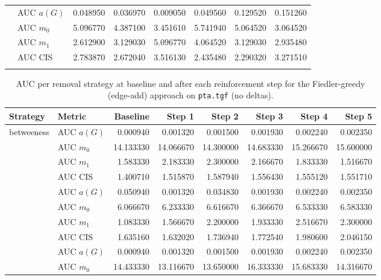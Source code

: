 \begin{table}[htbp]
\begin{tabular}{llrrrrrr}
    \addlinespace
    \multirow{4}{*}{random} & AUC $a(G)$ & 0.048950 & 0.036970 & 0.009050 & 0.049560 & 0.129520 & 0.151260 \\
    & AUC $m_0$ & 5.096770 & 4.387100 & 3.451610 & 5.741940 & 5.064520 & 3.064520 \\
    & AUC $m_1$ & 2.612900 & 3.129030 & 5.096770 & 4.064520 & 3.129030 & 2.935480 \\
    & AUC CIS & 2.783870 & 2.672040 & 3.516130 & 2.435480 & 2.290320 & 3.271510 \\
    \addlinespace
    \bottomrule
  \end{tabular}
\end{table}

\begin{table}[htbp]
  \centering
  \caption{AUC per removal strategy at baseline and after each reinforcement step for the Fiedler-greedy (edge-add) approach on \texttt{pta.tgf} (no deltas).}
  \label{tab:pta-fiedler_greedy-auc}
  \begin{tabular}{llrrrrrr}
    \toprule
    \textbf{Strategy} & \textbf{Metric} & \textbf{Baseline} & \textbf{Step 1} & \textbf{Step 2} & \textbf{Step 3} & \textbf{Step 4} & \textbf{Step 5} \\
    \midrule
    \multirow{4}{*}{betweeness} & AUC $a(G)$ & 0.000940 & 0.001320 & 0.001500 & 0.001930 & 0.002240 & 0.002350 \\
    & AUC $m_0$ & 14.133330 & 14.066670 & 14.300000 & 14.683330 & 15.266670 & 15.600000 \\
    & AUC $m_1$ & 1.583330 & 2.183330 & 2.300000 & 2.166670 & 1.833330 & 1.516670 \\
    & AUC CIS & 1.400710 & 1.515870 & 1.587940 & 1.556430 & 1.555120 & 1.551710 \\
    \addlinespace
    \multirow{4}{*}{closeness} & AUC $a(G)$ & 0.050940 & 0.001320 & 0.034830 & 0.001930 & 0.002240 & 0.002350 \\
    & AUC $m_0$ & 6.066670 & 6.233330 & 6.616670 & 6.366670 & 6.533330 & 6.583330 \\
    & AUC $m_1$ & 1.083330 & 1.566670 & 2.200000 & 1.933330 & 2.516670 & 2.300000 \\
    & AUC CIS & 1.635160 & 1.632020 & 1.736940 & 1.772540 & 1.980600 & 2.046150 \\
    \addlinespace
    \multirow{4}{*}{core influence} & AUC $a(G)$ & 0.000940 & 0.001320 & 0.001500 & 0.001930 & 0.002240 & 0.002350 \\
    & AUC $m_0$ & 14.433330 & 13.116670 & 13.650000 & 16.333330 & 15.683330 & 14.316670 \\

\end{tabular}
\end{table}
